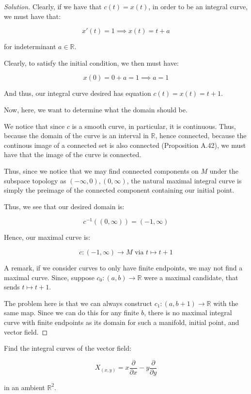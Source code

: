 \documentclass[10pt]{article}
\newenvironment{problem}[2][]{\begin{trivlist}
\item[\hskip \labelsep {\bfseries #1}\hskip \labelsep {\bfseries #2.}]}{\end{trivlist}}
\begin{document}
\begin{proof}[Solution]

Clearly, if we have that $c(t) = x(t)$, in order to be an integral curve, we must have that:

$$ x'(t) = 1 \implies x(t) = t + a$$

for indeterminant $a\in \mathbb{R}$.

Clearly, to satisfy the initial condition, we then must have:

$$x(0) = 0 + a = 1 \implies a = 1$$

And thus, our integral curve desired has equation $c(t) = x(t) = t + 1$.

Now, here, we want to determine what the domain should be.

We notice that since $c$ is a smooth curve, in particular, it is continuous. Thus, because the domain of the curve is an interval in $\mathbb{R}$, hence connected, because the continous image of a connected set is also connected (Proposition A.42), we must have that the image of the curve is connected.

Thus, since we notice that we may find connected components on $M$ under the subspace topology as $(-\infty, 0), (0, \infty)$, the natural maximal integral curve is simply the preimage of the connected component containing our initial point.

Thus, we see that our desired domain is:

$$c^{-1}((0, \infty)) = (-1, \infty)$$

Hence, our maximal curve is:

$$c: (-1, \infty) \to M \text{ via } t \mapsto t+1 $$

A remark,  if we consider curves to only have finite endpoints, we may not find a maximal curve. Since, suppose $c_0: (a,b) \to \mathbb{R}$ were a maximal candidate, that sends $t \mapsto t+1$.

The problem here is that we can always construct $c_1: (a, b+1) \to \mathbb{R}$ with the same map. Since we can do this for any finite $b$, there is no maximal integral curve with finite endpoints as its domain for such a manifold, initial point, and vector field.



\end{proof}

\begin{problem}{Question 5}

Find the integral curves of the vector field:

$$X_{(x,y)} = x \frac{\partial}{\partial x} - y \frac{\partial}{\partial y}  $$

in an ambient $\mathbb{R}^2$.
\end{problem}
\end{document}
